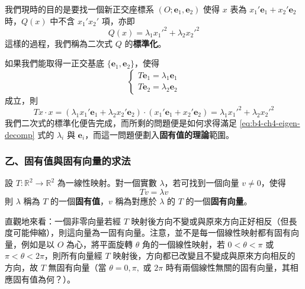 我們現時的目的是要找一個新正交座標系 $(O; \mathbf{e}_1, \mathbf{e}_2)$ 使得 $x$ 表為 $x_1' \mathbf{e}_1 + x_2' \mathbf{e}_2$ 時，$Q(x)$ 中不含 $x_1' x_2'$ 項，亦即
\begin{equation}
Q(x) = \lambda_1 {x_1'}^2 + \lambda_2 {x_2'}^2
\label{eq:b4-ch4-diagonalized-form}
\end{equation}
這樣的過程，我們稱為二次式 $Q$ 的\textbf{標準化}。

如果我們能取得一正交基底 $\{\mathbf{e}_1, \mathbf{e}_2\}$，使得
\begin{equation}
\begin{cases}
T\mathbf{e}_1 = \lambda_1 \mathbf{e}_1 \\
T\mathbf{e}_2 = \lambda_2 \mathbf{e}_2
\end{cases}
\label{eq:b4-ch4-eigen-decomp}
\end{equation}
成立，則
\begin{equation}
Tx \cdot x = (\lambda_1 x_1' \mathbf{e}_1 + \lambda_2 x_2' \mathbf{e}_2) \cdot (x_1' \mathbf{e}_1 + x_2' \mathbf{e}_2) = \lambda_1 {x_1'}^2 + \lambda_2 {x_2'}^2
\label{eq:b4-ch4-diagonalized-inner-prod}
\end{equation}
我們二次式的標準化便告完成，而所剩的問題便是如何求得滿足 \eqref{eq:b4-ch4-eigen-decomp} 式的 $\lambda_i$ 與 $\mathbf{e}_i$，而這一問題便劃入\textbf{固有值的理論}範圍。

\subsubsection*{乙、\quad 固有值與固有向量的求法}

\begin{definition}
設 $T: \mathbb{R}^2 \to \mathbb{R}^2$ 為一線性映射。對一個實數 $\lambda$，若可找到一個向量 $v \ne 0$，使得
\begin{equation}
Tv = \lambda v
\label{eq:b4-ch4-eigen-def}
\end{equation}
則 $\lambda$ 稱為 $T$ 的一個\textbf{固有值}，$v$ 稱為對應於 $\lambda$ 的 $T$ 的一個\textbf{固有向量}。
\end{definition}

直觀地來看：一個非零向量若經 $T$ 映射後方向不變或與原來方向正好相反（但長度可能伸縮），則這向量為一固有向量。注意，並不是每一個線性映射都有固有向量，例如是以 $O$ 為心，將平面旋轉 $\theta$ 角的一個線性映射，若 $0 < \theta < \pi$ 或 $\pi < \theta < 2\pi$，則所有向量經 $T$ 映射後，方向都已改變且不變成與原來方向相反的方向，故 $T$ 無固有向量（當 $\theta = 0, \pi,$ 或 $2\pi$ 時有兩個線性無關的固有向量，其相應固有值為何？）。

